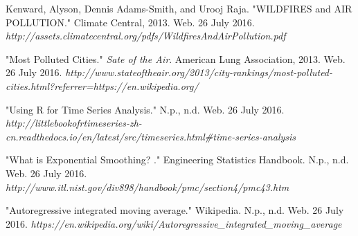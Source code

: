 \documentclass[10pt]{article}
\begin{document}
\begin{thebibliography}{99}
  Kenward, Alyson, Dennis Adams-Smith, and Urooj Raja. "WILDFIRES and AIR POLLUTION." Climate Central, 2013. Web. 26 July 2016. \textit{http://assets.climatecentral.org/pdfs/WildfiresAndAirPollution.pdf}
 
  "Most Polluted Cities." \textit{Sate of the Air}. American Lung Association, 2013. Web. 26 July 2016. \textit{http://www.stateoftheair.org/2013/city-rankings/most-polluted-cities.html?referrer=https://en.wikipedia.org/}
 
 
 
  "Using R for Time Series Analysis." N.p., n.d. Web. 26 July 2016. \textit{http://littlebookofrtimeseries-zh-cn.readthedocs.io/en/latest/src/timeseries.html\#time-series-analysis}
 
  "What is Exponential Smoothing? ." Engineering Statistics Handbook. N.p., n.d. Web. 26 July 2016. \textit{http://www.itl.nist.gov/div898/handbook/pmc/section4/pmc43.htm}
 
  "Autoregressive integrated moving average." Wikipedia. N.p., n.d. Web. 26 July 2016. \textit{https://en.wikipedia.org/wiki/Autoregressive\_integrated\_moving\_average}
 
 
 
 \end{thebibliography}
\end{document}
